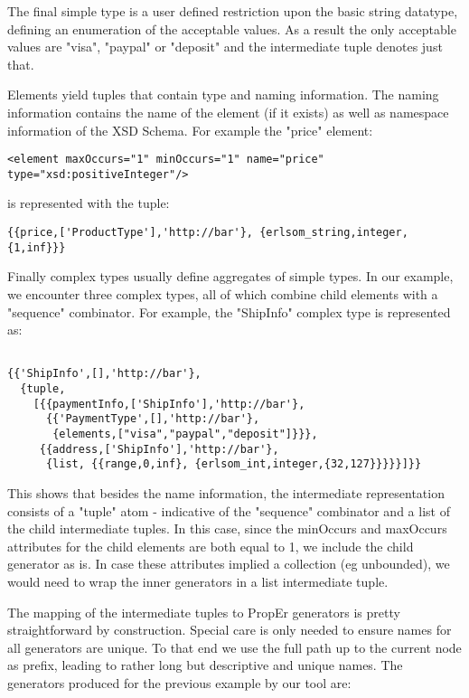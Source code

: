 \documentclass[submission,copyright,a4]{eptcs}
\begin{document}
The final simple type is a user defined restriction upon the basic string datatype, defining an enumeration of the acceptable values. As a result the only acceptable values are "visa", "paypal" or "deposit" and the intermediate tuple denotes just that.

Elements yield tuples that contain type and naming information. The naming information contains the name of the element (if it exists) as well as namespace information of the XSD Schema. For example the "price" element:

\begin{lstlisting}
<element maxOccurs="1" minOccurs="1" name="price" type="xsd:positiveInteger"/>
\end{lstlisting}

is represented with the tuple:

\begin{lstlisting}
{{price,['ProductType'],'http://bar'}, {erlsom_string,integer,{1,inf}}}
\end{lstlisting}

Finally complex types usually define aggregates of simple types. In our example, we encounter three complex types, all of which combine child elements with a "sequence" combinator. For example, the "ShipInfo" complex type is represented as:

\begin{lstlisting}

{{'ShipInfo',[],'http://bar'},
  {tuple,
    [{{paymentInfo,['ShipInfo'],'http://bar'},
      {{'PaymentType',[],'http://bar'},
       {elements,["visa","paypal","deposit"]}}},
     {{address,['ShipInfo'],'http://bar'},
      {list, {{range,0,inf}, {erlsom_int,integer,{32,127}}}}}]}}
\end{lstlisting}

This shows that besides the name information, the intermediate representation consists of a "tuple" atom - indicative of the "sequence" combinator and a list of the child intermediate tuples. In this case, since the minOccurs and maxOccurs attributes for the child elements are both equal to 1, we include the child generator as is. In case these attributes implied a collection (eg unbounded), we would need to wrap the inner generators in a list intermediate tuple.


The mapping of the intermediate tuples to PropEr generators is pretty straightforward by construction. Special care is only needed to ensure names for all generators are unique. To that end we use the full path up to the current node as prefix, leading to rather long but descriptive and unique names. The generators produced for the previous example by our tool are:
\end{document}
